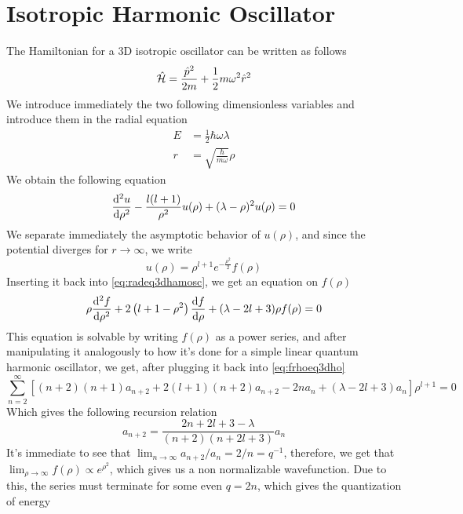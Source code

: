 \documentclass[../qm.tex]{subfiles}
\begin{document}
	\section{Isotropic Harmonic Oscillator}
	The Hamiltonian for a 3D isotropic oscillator can be written as follows
	\begin{equation}
		\hat{\mathcal{H}}=\frac{\hat{p}^2}{2m}+\frac{1}{2}m\omega^2\hat{r}^2
		\label{eq:3dharmosc}
	\end{equation}
	We introduce immediately the two following dimensionless variables and introduce them in the radial equation
	\begin{equation*}
		\begin{aligned}
			E&=\frac{1}{2}\hbar\omega\lambda\\
			r&=\sqrt{\frac{\hbar}{m\omega}}\rho
		\end{aligned}
	\end{equation*}
	We obtain the following equation
	\begin{equation}
		\derivative[2]{u}{\rho}-\frac{l(l+1)}{\rho^2}u(\rho)+(\lambda-\rho)^2u(\rho)=0
		\label{eq:radeq3dhamosc}
	\end{equation}
	We separate immediately the asymptotic behavior of $u(\rho)$, and since the potential diverges for $r\to\infty$, we write
	\begin{equation}
		u(\rho)=\rho^{l+1}e^{-\frac{\rho^2}{2}}f(\rho)
		\label{eq:asbehavior3darmosc}
	\end{equation}
	Inserting it back into \eqref{eq:radeq3dhamosc}, we get an equation on $f(\rho)$
	\begin{equation}
		\rho\derivative[2]{f}{\rho}+2\left( l+1-\rho^2 \right)\derivative{f}{\rho}+(\lambda-2l+3)\rho f(\rho)=0
		\label{eq:frhoeq3dho}
	\end{equation}
	This equation is solvable by writing $f(\rho)$ as a power series, and after manipulating it analogously to how it's done for a simple linear quantum harmonic oscillator, we get, after plugging it back into \eqref{eq:frhoeq3dho}
	\begin{equation}
		\sum_{n=2}^{\infty}\left[ (n+2)(n+1)a_{n+2}+2(l+1)(n+2)a_{n+2}-2na_n+(\lambda-2l+3)a_n \right]\rho^{l+1}=0
		\label{eq:frhosumrel}
	\end{equation}
	Which gives the following recursion relation
	\begin{equation}
		a_{n+2}=\frac{2n+2l+3-\lambda}{(n+2)(n+2l+3)}a_n
		\label{eq:recursionrel}
	\end{equation}
	It's immediate to see that $\lim_{n\to\infty}a_{n+2}/a_n=2/n=q^{-1}$, therefore, we get that $\lim_{\rho\to\infty}f(\rho)\propto e^{\rho^2}$, which gives us a non normalizable wavefunction. Due to this, the series must terminate for some even $q=2n$, which gives the quantization of energy
\end{document}
